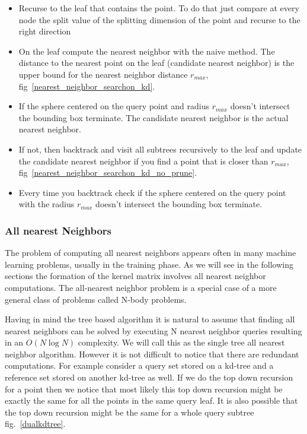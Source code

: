 \documentclass[12pt,letterpaper,doublespaced,ETD,dvips,proposal]{gtthesis}
\begin{document}
\begin{Body}
\begin{itemize}
   \item Recurse to the leaf that contains the point. To do that
   just compare at every node the split value of the splitting
   dimension of the point and recurse to the right direction
   \item On the leaf compute the nearest neighbor with the naive
   method. The distance to the nearest point on the leaf (candidate nearest neighbor)
   is the upper bound for the nearest neighbor distance $r_{max}$,
   fig~\ref{nearest_neighbor_searchon_kd}.
   \item If the sphere centered on the query point and radius
   $r_{max}$ doesn't intersect the bounding box terminate. The
   candidate nearest neighbor is the actual nearest neighbor.
   \item If not, then backtrack and visit all subtrees recursively
   to the leaf and update the candidate nearest neighbor if you find
   a point that is closer than $r_{max}$, fig~\ref{nearest_neighbor_searchon_kd_no_prune}.
   \item Every time you backtrack check if the sphere centered on
   the query point with the radius $r_{max}$ doesn't intersect the
   bounding box terminate.
 \end{itemize}


\subsubsection{All nearest Neighbors}
The problem of computing all nearest neighbors appears often in many
machine learning problems, usually in the training phase. As we will
see in the following sections the formation of the kernel matrix
involves all nearest neighbor computations. The all-nearest neighbor
problem is a special case of a more general class of problems called
N-body problems.

Having in mind the tree based algorithm it is natural to assume that
finding all nearest neighbors can be solved by executing N nearest
neighbor queries resulting in an $O(N\log N)$ complexity. We will
call this as the single tree all nearest neighbor algorithm. However
it is not difficult to notice that there are redundant computations.
For example consider  a query set stored on a kd-tree and a
reference set stored on another kd-tree as well. If we do the top
down recursion for a point then we notice that most likely this top
down recursion might be exactly the same for all the points in the
same query leaf. It is also possible that the top down recursion
might be the same for a whole query subtree fig.~\ref{dualkdtree}.


\end{Body}
\end{document}
